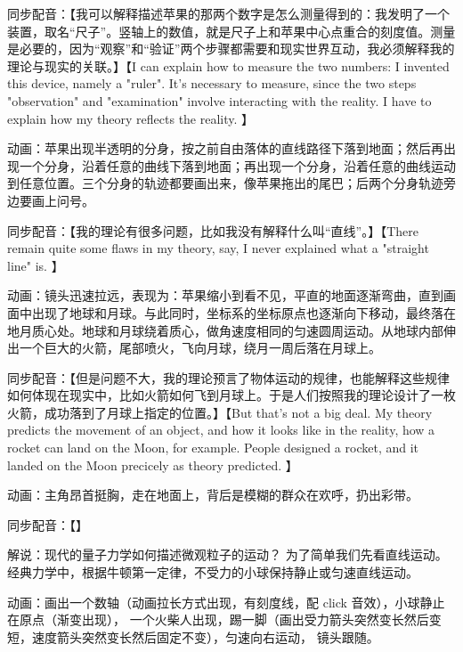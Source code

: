 同步配音：【我可以解释描述苹果的那两个数字是怎么测量得到的：我发明了一个装置，取名“尺子”。竖轴上的数值，就是尺子上和苹果中心点重合的刻度值。测量是必要的，因为“观察”和“验证”两个步骤都需要和现实世界互动，我必须解释我的理论与现实的关联。】【I can explain how to measure the two numbers: I invented this device, namely a "ruler". It's necessary to measure, since the two steps "observation" and "examination" involve interacting with the reality. I have to explain how my theory reflects the reality. 】



动画：苹果出现半透明的分身，按之前自由落体的直线路径下落到地面；然后再出现一个分身，沿着任意的曲线下落到地面；再出现一个分身，沿着任意的曲线运动到任意位置。三个分身的轨迹都要画出来，像苹果拖出的尾巴；后两个分身轨迹旁边要画上问号。


同步配音：【我的理论有很多问题，比如我没有解释什么叫“直线”。】【There remain quite some flaws in my theory, say, I never explained what a "straight line" is. 】



动画：镜头迅速拉远，表现为：苹果缩小到看不见，平直的地面逐渐弯曲，直到画面中出现了地球和月球。与此同时，坐标系的坐标原点也逐渐向下移动，最终落在地月质心处。地球和月球绕着质心，做角速度相同的匀速圆周运动。从地球内部伸出一个巨大的火箭，尾部喷火，飞向月球，绕月一周后落在月球上。


同步配音：【但是问题不大，我的理论预言了物体运动的规律，也能解释这些规律如何体现在现实中，比如火箭如何飞到月球上。于是人们按照我的理论设计了一枚火箭，成功落到了月球上指定的位置。】【But that's not a big deal. My theory predicts the movement of an object, and how it looks like in the reality, how a rocket can land on the Moon, for example. People designed a rocket, and it landed on the Moon precicely as theory predicted. 】


动画：主角昂首挺胸，走在地面上，背后是模糊的群众在欢呼，扔出彩带。


同步配音：【】









解说：现代的量子力学如何描述微观粒子的运动？ 为了简单我们先看直线运动。 经典力学中，根据牛顿第一定律，不受力的小球保持静止或匀速直线运动。

动画：画出一个数轴（动画拉长方式出现，有刻度线，配 click 音效），小球静止在原点（渐变出现）， 一个火柴人出现，踢一脚（画出受力箭头突然变长然后变短，速度箭头突然变长然后固定不变），匀速向右运动， 镜头跟随。

